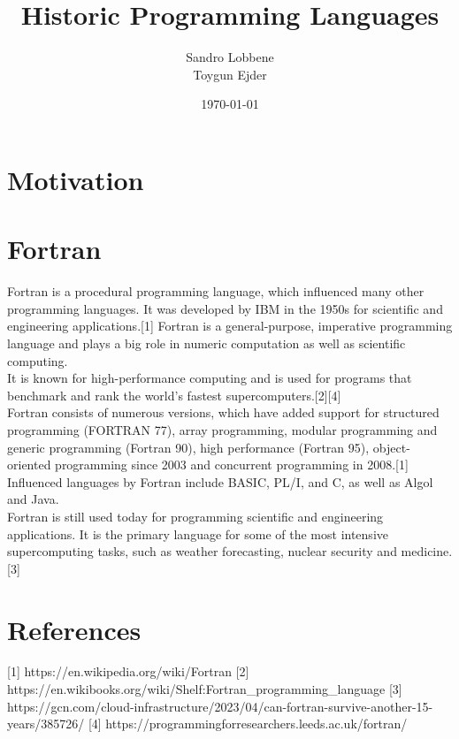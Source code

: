 \documentclass[12pt,a4paper]{scrartcl}
\title{Historic Programming Languages}
\author{Sandro Lobbene\\Toygun Ejder\\}
\date{\today}
\begin{document}
\maketitle

\section{Motivation}

\section{Fortran}
Fortran is a procedural programming language, which influenced many other programming languages. It was developed by IBM in the 1950s for scientific and engineering applications.[1] Fortran is a general-purpose, imperative programming language and plays a big role in numeric computation as well as scientific computing.\\
It is known for high-performance computing and is used for programs that benchmark and rank the world's fastest supercomputers.[2][4]\\
Fortran consists of numerous versions, which have added support for structured programming (FORTRAN 77), array programming, modular programming and generic programming (Fortran 90), high performance (Fortran 95), object-oriented programming since 2003 and concurrent programming in 2008.[1] Influenced languages by Fortran include BASIC, PL/I, and C, as well as Algol and Java.\\
Fortran is still used today for programming scientific and engineering applications. It is the primary language for some of the most intensive supercomputing tasks, such as weather forecasting, nuclear security and medicine. [3]\\


\section{References}
[1] https://en.wikipedia.org/wiki/Fortran
[2] https://en.wikibooks.org/wiki/Shelf:Fortran_programming_language
[3] https://gcn.com/cloud-infrastructure/2023/04/can-fortran-survive-another-15-years/385726/
[4] https://programmingforresearchers.leeds.ac.uk/fortran/
\end{document}
